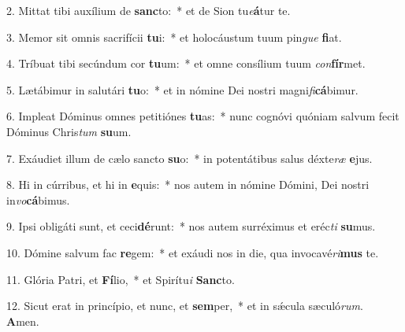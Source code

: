 2. Mittat tibi auxílium de \textbf{sanc}to:~*  et de Sion tu\textit{e}\textbf{á}tur te.\

3. Memor sit omnis sacrifícii \textbf{tu}i:~*  et holocáustum tuum pin\textit{gue} \textbf{fi}at.\

4. Tríbuat tibi secúndum cor \textbf{tu}um:~*  et omne consílium tuum \textit{con}\textbf{fír}met.\

5. Lætábimur in salutári \textbf{tu}o:~*  et in nómine Dei nostri magni\textit{fi}\textbf{cá}bimur.\

6. Impleat Dóminus omnes petitiónes \textbf{tu}as:~*  nunc cognóvi quóniam salvum fecit Dóminus Chris\textit{tum} \textbf{su}um.\

7. Exáudiet illum de cælo sancto \textbf{su}o:~*  in potentátibus salus déxte\textit{ræ} \textbf{e}jus.\

8. Hi in cúrribus, et hi in \textbf{e}quis:~*  nos autem in nómine Dómini, Dei nostri in\textit{vo}\textbf{cá}bimus.\

9. Ipsi obligáti sunt, et ceci\textbf{dé}runt:~*  nos autem surréximus et eréc\textit{ti} \textbf{su}mus.\

10. Dómine salvum fac \textbf{re}gem:~*  et exáudi nos in die, qua invocavé\textit{ri}\textbf{mus} te.\

11. Glória Patri, et \textbf{Fí}lio,~*  et Spirítu\textit{i} \textbf{Sanc}to.\

12. Sicut erat in princípio, et nunc, et \textbf{sem}per,~*  et in sǽcula sæculó\textit{rum}. \textbf{A}men.\

